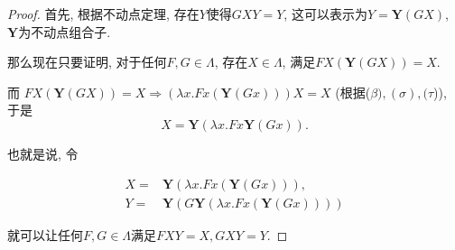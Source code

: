 \begin{proof}
    首先, 根据不动点定理, 存在$Y$使得$GXY=Y$, 这可以表示为$Y=\mathbf{Y}(GX)$, $\mathbf{Y}$为不动点组合子.
	
	那么现在只要证明, 对于任何$F,G\in\Lambda$, 存在$X\in\Lambda$, 满足$FX(\mathbf{Y}(GX))=X$.
	
	而 $FX(\mathbf{Y}(GX))=X\Rightarrow (\lambda x.Fx(\mathbf{Y}(Gx)))X=X$ (根据($\beta),(\sigma),(\tau$)), 于是$$X=\mathbf{Y}(\lambda x.Fx\mathbf{Y}(Gx)).$$
	
	也就是说, 令
	
	\begin{align*}
		X=&\mathbf{Y}(\lambda x.Fx(\mathbf{Y}(Gx))),\\
		Y=&\mathbf{Y}(G\mathbf{Y}(\lambda x.Fx(\mathbf{Y}(Gx))))
	\end{align*}
	
	就可以让任何$F,G\in\Lambda$满足$FXY=X, GXY=Y$.
\end{proof}